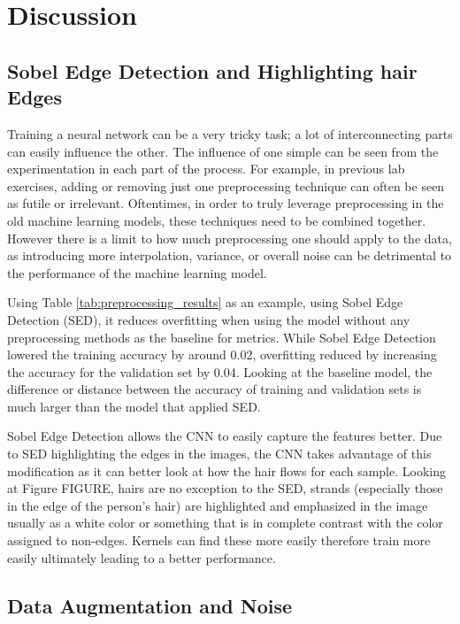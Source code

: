 \section{Discussion}

\subsection{Sobel Edge Detection and Highlighting hair Edges}

Training a neural network can be a very tricky task; a lot of interconnecting parts can easily influence the other. The influence of one simple can be seen from the experimentation in each part of the process. For example, in previous lab exercises, adding or removing just one preprocessing technique can often be seen as futile or irrelevant. Oftentimes, in order to truly leverage preprocessing in the old machine learning models, these techniques need to be combined together. However there is a limit to how much preprocessing one should apply to the data, as introducing more interpolation, variance, or overall noise can be detrimental to the performance of the machine learning model.

Using Table \ref{tab:preprocessing_results} as an example, using Sobel Edge Detection (SED), it reduces overfitting when using the model without any preprocessing methods as the baseline for metrics. While Sobel Edge Detection lowered the training accuracy by around 0.02, overfitting reduced by increasing the accuracy for the validation set by 0.04. Looking at the baseline model, the difference or distance between the accuracy of training and validation sets is much larger than the model that applied SED. 


Sobel Edge Detection allows the CNN to easily capture the features better. Due to SED highlighting the edges in the images, the CNN takes advantage of this modification as it can better look at how the hair flows for each sample. Looking at Figure FIGURE, hairs are no exception to the SED, strands (especially those in the edge of the person's hair) are highlighted and emphasized in the image usually as a white color or something that is in complete contrast with the color assigned to non-edges. Kernels can find these more easily therefore train more easily ultimately leading to a better performance.

\subsection{Data Augmentation and Noise}

